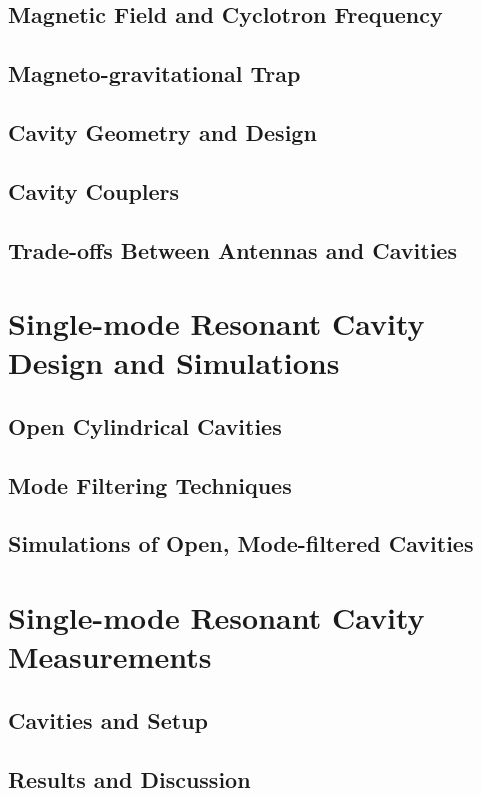 \subsection{Magnetic Field and Cyclotron Frequency}

\subsection{Magneto-gravitational Trap}

\subsection{Cavity Geometry and Design}

\subsection{Cavity Couplers}

\subsection{Trade-offs Between Antennas and Cavities}

\section{Single-mode Resonant Cavity Design and Simulations}
\label{sec:chap6-single-mode-cavity-sims}

\subsection{Open Cylindrical Cavities}

\subsection{Mode Filtering Techniques}

\subsection{Simulations of Open, Mode-filtered Cavities}

\section{Single-mode Resonant Cavity Measurements}
\label{sec:chap6-single-mode-cavity-measurement}

\subsection{Cavities and Setup}

\subsection{Results and Discussion}


